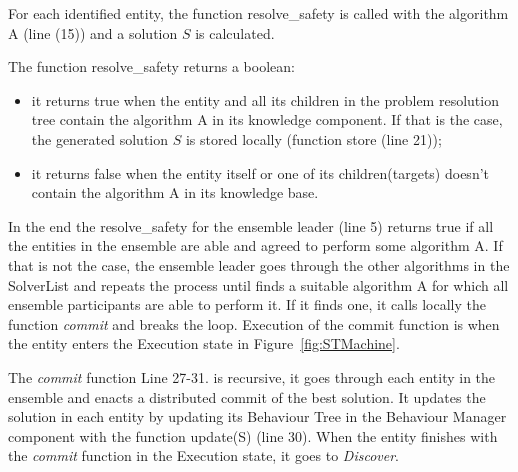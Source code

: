 \documentclass[journal]{IEEEtran}
\theoremstyle{definition}
\begin{document}
For each identified entity, the function resolve\_safety is called with the algorithm A (line (15)) 
and a solution $S$ is calculated. 

The function resolve\_safety returns a boolean: 
\begin{itemize}
\item it returns true when the entity and all its children in the problem resolution tree contain the algorithm A in its knowledge component.  If that is the case, the generated solution $S$ is stored locally (function store (line 21));
\item it returns false when the entity itself or one of its children(targets) doesn't contain the algorithm A in its knowledge base.
\end{itemize}

In the end the resolve\_safety for the ensemble leader (line 5) returns true if all the entities in the ensemble are able and agreed to perform some algorithm A. If that is not the case, the ensemble leader goes through the other algorithms in the SolverList and repeats the process until finds a suitable algorithm A for which all ensemble participants are able to perform it. If it finds one, it calls locally the function \textit{commit} and breaks the loop. Execution of the commit function is when the entity enters the Execution state in Figure~\ref{fig:STMachine}.

The \textit{commit} function 
{Line 27-31.} is recursive, it goes through each entity in the ensemble and enacts a distributed commit of the best solution. It updates the solution in each entity by updating its Behaviour Tree in the Behaviour Manager component with the function update(S) (line 30).
When the entity finishes with the \textit{commit} function in the Execution state, it goes to \textit{Discover}.


\end{document}
